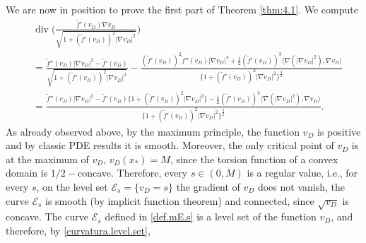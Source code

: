 \documentclass[10pt,reqno,a4paper]{article}
\numberwithin{equation}{section}
\theoremstyle{plain}
\newtheorem{lemma}[theorem]{Lemma}
\theoremstyle{definition}
\newcommand{\mE}{\mathcal{E}}
\renewcommand{\b}{\beta}
\newcommand{\pa}{\partial}
\renewcommand{\div}{\operatorname{div}} %
\begin{document}
We are now in position to prove the first part of 
Theorem \ref{thm:4.1}.
We compute
\begin{align*}
& \div \bigg( \frac{\tilde f'  (v_D) \nabla v_D }{\sqrt{ 1 + (\tilde f' (v_D))^2 |\nabla v_D|^2 }} \bigg)
\\ 
& = \frac{\tilde f'' (v_D) |\nabla v_D|^2 - \tilde f'(v_D) }{\sqrt{ 1 + (\tilde f'(v_D))^2 |\nabla v_D|^2}}
-\frac{ (\tilde f'(v_D))^2 \tilde f''(v_D) |\nabla v_D|^4 + \frac12 (\tilde f'(v_D))^3 
\langle \nabla ( |\nabla v_D|^2 ), \nabla v_D \rangle }
{ \{ 1 + (\tilde f'(v_D))^2 |\nabla v_D|^2 \}^\frac32}
\\
& = \frac{ \tilde f'' (v_D) |\nabla v_D|^2 - \tilde f' (v_D) \{ 1 + (\tilde f'(v_D))^2 |\nabla v_D|^2 \} 
- \frac12(\tilde f' (v_D))^3 \langle \nabla (|\nabla v_D|^2), \nabla v_D \rangle }
{ \{ 1 + (\tilde f'(v_D))^2 |\nabla v_D|^2 \}^\frac32}.
\end{align*}
As already observed above, 
by the maximum principle, the function $v_D$ is positive and by classic PDE results it is smooth. 
Moreover, the only critical point of $v_D$ is at the maximum of $v_D$, $v_D(x_*) = M$, 
since the torsion function of a convex domain is $1/2-$concave.
Therefore, every $s \in (0, M)$ is a regular value, i.e., 
for every $s$, on the level set $ \mE_s = \{v_D=s\}$ the gradient of $v_D$ does not vanish, 
the curve $\mE_s$ is smooth (by implicit function theorem) and connected, since $\sqrt {v_D}$ is concave. 
The curve $\mE_s$ defined in \eqref{def.mE.s} is a level set of the function $v_D$,
and therefore, by \eqref{curvatura.level.set}, 
\end{document}
